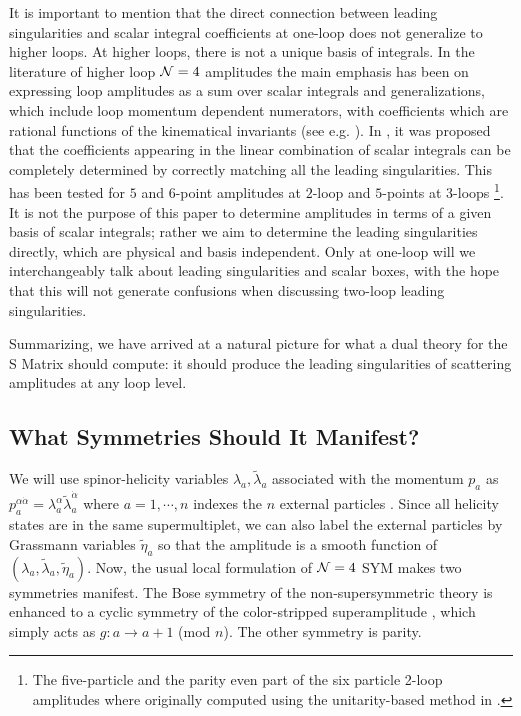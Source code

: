 \documentclass[12pt]{article}
\begin{document}
It is important to mention that the direct connection between
leading singularities and scalar integral coefficients at one-loop
does not generalize to higher loops. At higher loops, there is not a
unique basis of integrals. In the literature of higher loop ${\cal
N}=4$ amplitudes the main emphasis has been on expressing loop
amplitudes as a sum over scalar integrals and generalizations, which
include loop momentum dependent numerators, with coefficients which
are rational functions of the kinematical invariants (see e.g. \cite{Bern:2006ew, Bern:2007ct}). In
\cite{Cachazo:2008vp}, it was proposed that the coefficients appearing in the linear combination of scalar integrals can be completely determined 
by correctly matching all the leading singularities. 
This has been tested for $5$ and
$6$-point amplitudes at $2$-loop and $5$-points at 3-loops \cite{Cachazo:2008vp, Cachazo:2008hp, Spradlin:2008uu}\footnote{The five-particle and the parity even part of the six particle 2-loop amplitudes where originally computed using the unitarity-based method in \cite{zzbb}.}.
It is not the purpose of this paper to determine amplitudes in terms of
a given basis of scalar integrals; rather we aim to determine the
leading singularities directly, which are physical and basis
independent. Only at one-loop will we interchangeably talk about
leading singularities and scalar boxes, with the hope that this will
not generate confusions when discussing two-loop leading
singularities.

Summarizing, we have arrived at a natural picture for what a dual theory for the S
Matrix should compute: it should produce the leading singularities
of scattering amplitudes at any loop level.

\subsection{What Symmetries Should It Manifest?}

We will use spinor-helicity variables $\lambda_a,\tilde \lambda_a$ associated with the momentum $p_a$ as $p^{\alpha \dot \alpha}_a = \lambda_a^\alpha \tilde \lambda^{\dot \alpha}_a$ where $a=1, \cdots, n$ indexes the $n$ external particles \cite{Dixon:1996wi}. Since all helicity states are in the same supermultiplet, we can also label the external particles by Grassmann variables $\tilde \eta_a$ so that the amplitude is a smooth function of $(\lambda_a,\tilde \lambda_a,\tilde \eta_a)$. Now, the usual local formulation of ${\cal N}=4$ SYM makes two
symmetries manifest. The Bose symmetry of the non-supersymmetric theory is enhanced to a cyclic symmetry of the color-stripped superamplitude \cite{Mangano:1990by}, which simply acts as $g: a \to a+1$ (mod $n$).  The other symmetry is parity.
\end{document}
